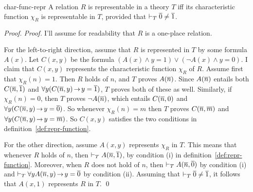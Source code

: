 \begin{proposition}{}{char-func-repr}
  A relation $R$ is representable in a theory $T$ iff
  its characteristic function $\chi_{R}$ is representable in $T$,
  provided that $\vdash_{T} \overline{0} \not= \overline{1}$.
\end{proposition}
\begin{proof}
  \emph{Proof.}
  I'll assume for readability that $R$ is a one-place relation.
  
  For the left-to-right direction,
  assume that $R$ is represented in $T$ by some formula $A(x)$.
  Let $C(x,y)$ be the formula $(A(x) \land y\!=\!\num{1}) \lor (\neg A(x) \land y\!=\!0)$.
  I claim that $C(x,y)$ represents the characteristic function $\chi_{R}$ of $R$.
  Assume first that $\chi_{R}(n) = 1$.
  Then $R$ holds of $n$,
  and $T$ proves $A(\overline{n})$.
  Since $A(\overline{n})$ entails both $C(\overline{n},\overline{1})$ and $\forall y(C(\num{n},y) \to y = \num{1})$,
  $T$ proves both of these as well.
  Similarly, if $\chi_{R}(n) = 0$,
  then $T$ proves $\neg A(\overline{n})$,
  which entails $C(\overline{n},0)$ and $\forall y(C(\num{n},y) \to y = \num{0})$.
  So whenever $\chi_{R}(n) = m$ then $T$ proves $C(\overline{n},\overline{m})$
  and $\forall y(C(\num{n},y) \to y = \num{m})$.
  So $C(x,y)$ satisfies the two conditions in definition~\ref{def:repr-function}.

  For the other direction,
  assume $A(x,y)$ represents $\chi_{R}$ in $T$.
  This means that whenever $R$ holds of $n$,
  then $\vdash_{T} A(\overline{n},\overline{1})$,
  by condition (i) in definition~\ref{def:repr-function}.
  Moreover,
  when $R$ does not hold of $n$,
  then $\vdash_{T} A(\overline{n},\overline{0})$ by condition (i)
  and $\proves_{T} \forall yA(\num{n},y) \to y=\num{0}$ by condition (ii).
  Assuming that $\vdash_{T} \overline{0} \not= \overline{1}$,
  it follows that $A(x,1)$ represents $R$ in $T$.
  \qed
\end{proof}




